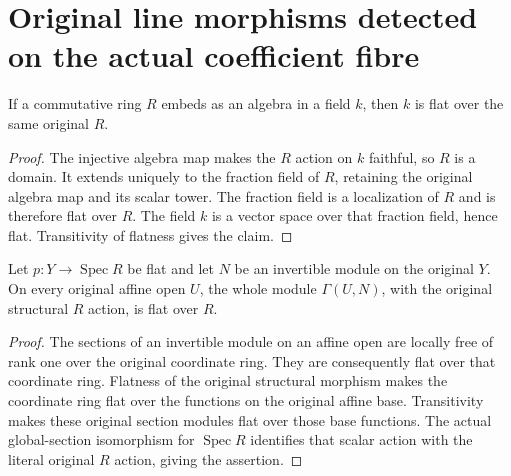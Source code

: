 \section{Original line morphisms detected on the actual coefficient fibre}

\begin{lemma}
\label{lem:kn-original-line-embedded-field-flat}
\leanok
If a commutative ring $R$ embeds as an algebra in a field $k$, then $k$ is flat over
the same original $R$.
\end{lemma}
\begin{proof}
The injective algebra map makes the $R$ action on $k$ faithful, so $R$ is a domain.  It extends
uniquely to the fraction field of $R$, retaining the original algebra
map and its scalar tower.  The fraction field is a localization of $R$
and is therefore flat over $R$.  The field $k$ is a vector space over
that fraction field, hence flat.  Transitivity of flatness gives the claim.
\end{proof}

\begin{lemma}
\label{lem:kn-original-line-affine-sections-flat}
\leanok
{}
Let $p:Y\to\operatorname{Spec}R$ be flat and let $N$ be an invertible
module on the original $Y$.  On every original affine open $U$, the whole
module $\Gamma(U,N)$, with the original structural $R$ action, is flat over $R$.
\end{lemma}
\begin{proof}
The sections of an invertible module on an affine open are locally free
of rank one over the original coordinate ring.  They are consequently
flat over that coordinate ring.  Flatness of the original structural
morphism makes the coordinate ring flat over the functions on the
original affine base.  Transitivity makes these original section
modules flat over those base functions.  The actual global-section
isomorphism for $\operatorname{Spec}R$ identifies that scalar action
with the literal original $R$ action, giving the assertion.
\end{proof}

